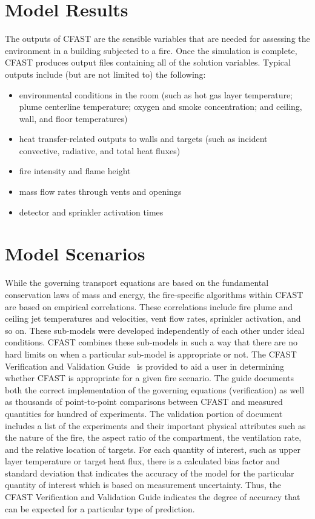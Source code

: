 \section{Model Results}

The outputs of CFAST are the sensible variables that are needed for assessing the environment in a building subjected to a fire. Once the simulation is complete, CFAST produces output files containing all of the solution variables.  Typical outputs include (but are not limited to) the following:
\begin{itemize}
\item environmental conditions in the room (such as hot gas layer temperature; plume centerline temperature; oxygen and smoke concentration; and ceiling, wall, and floor temperatures)
\item heat transfer-related outputs to walls and targets (such as incident convective, radiative, and total heat fluxes)
\item fire intensity and flame height
\item mass flow rates through vents and openings
\item detector and sprinkler activation times
\end{itemize}


\section{Model Scenarios}

While the governing transport equations are based on the fundamental conservation laws of mass and energy, the fire-specific algorithms within CFAST are based on empirical correlations. These correlations include fire plume and ceiling jet temperatures and velocities, vent flow rates, sprinkler activation, and so on. These sub-models were developed independently of each other under ideal conditions. CFAST combines these sub-models in such a way that there are no hard limits on when a particular sub-model is appropriate or not. The CFAST Verification and Validation Guide~\cite{CFAST_Valid_Guide_8} is provided to aid a user in determining whether CFAST is appropriate for a given fire scenario. The guide documents both the correct implementation of the governing equations (verification) as well as thousands of point-to-point comparisons between CFAST and measured quantities for hundred of experiments. The validation portion of document includes a list of the experiments and their important physical attributes such as the nature of the fire, the aspect ratio of the compartment, the ventilation rate, and the relative location of targets. For each quantity of interest, such as upper layer temperature or target heat flux, there is a calculated bias factor and standard deviation that indicates the accuracy of the model for the particular quantity of interest which is based on measurement uncertainty. Thus, the CFAST Verification and Validation Guide indicates the degree of accuracy that can be expected for a particular type of prediction.

